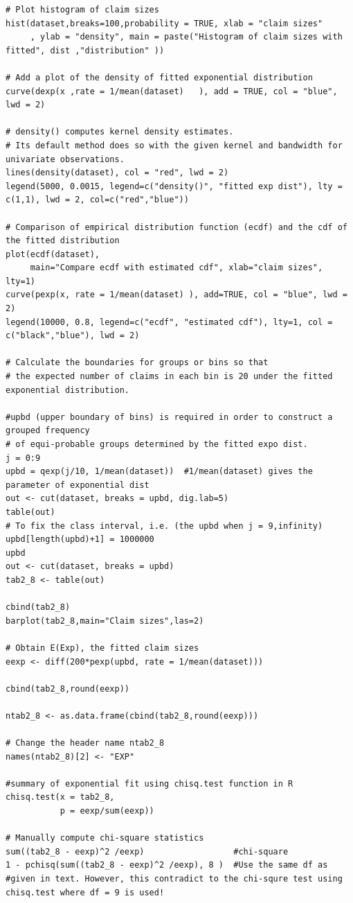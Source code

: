 \documentclass[
]{book}
\theoremstyle{definition}
\theoremstyle{definition}
\theoremstyle{definition}
\theoremstyle{definition}
\theoremstyle{remark}
\begin{document}
\begin{verbatim}
# Plot histogram of claim sizes
hist(dataset,breaks=100,probability = TRUE, xlab = "claim sizes" 
     , ylab = "density", main = paste("Histogram of claim sizes with fitted", dist ,"distribution" ))

# Add a plot of the density of fitted exponential distribution
curve(dexp(x ,rate = 1/mean(dataset)   ), add = TRUE, col = "blue", lwd = 2)

# density() computes kernel density estimates. 
# Its default method does so with the given kernel and bandwidth for univariate observations.
lines(density(dataset), col = "red", lwd = 2)
legend(5000, 0.0015, legend=c("density()", "fitted exp dist"), lty = c(1,1), lwd = 2, col=c("red","blue"))

# Comparison of empirical distribution function (ecdf) and the cdf of the fitted distribution
plot(ecdf(dataset),
     main="Compare ecdf with estimated cdf", xlab="claim sizes", lty=1)
curve(pexp(x, rate = 1/mean(dataset) ), add=TRUE, col = "blue", lwd = 2)
legend(10000, 0.8, legend=c("ecdf", "estimated cdf"), lty=1, col = c("black","blue"), lwd = 2)

# Calculate the boundaries for groups or bins so that 
# the expected number of claims in each bin is 20 under the fitted exponential distribution. 

#upbd (upper boundary of bins) is required in order to construct a grouped frequency
# of equi-probable groups determined by the fitted expo dist.
j = 0:9
upbd = qexp(j/10, 1/mean(dataset))  #1/mean(dataset) gives the parameter of exponential dist
out <- cut(dataset, breaks = upbd, dig.lab=5)
table(out)
# To fix the class interval, i.e. (the upbd when j = 9,infinity)
upbd[length(upbd)+1] = 1000000
upbd
out <- cut(dataset, breaks = upbd)
tab2_8 <- table(out)

cbind(tab2_8)
barplot(tab2_8,main="Claim sizes",las=2)

# Obtain E(Exp), the fitted claim sizes
eexp <- diff(200*pexp(upbd, rate = 1/mean(dataset)))

cbind(tab2_8,round(eexp))

ntab2_8 <- as.data.frame(cbind(tab2_8,round(eexp)))

# Change the header name ntab2_8
names(ntab2_8)[2] <- "EXP"

#summary of exponential fit using chisq.test function in R
chisq.test(x = tab2_8,
           p = eexp/sum(eexp))

# Manually compute chi-square statistics
sum((tab2_8 - eexp)^2 /eexp)                  #chi-square
1 - pchisq(sum((tab2_8 - eexp)^2 /eexp), 8 )  #Use the same df as 
#given in text. However, this contradict to the chi-squre test using chisq.test where df = 9 is used!


\end{verbatim}
\end{document}
